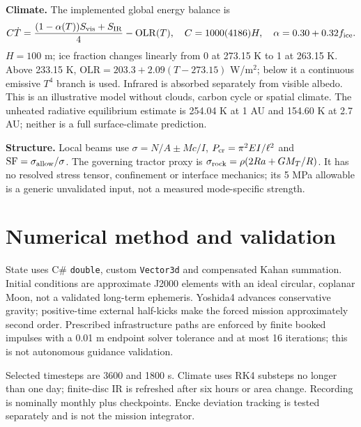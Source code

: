 ﻿\documentclass[10pt,a4paper]{article}
\begin{document}
\textbf{Climate.} The implemented global energy balance is
\[
C\dot T=\frac{(1-\alpha(T))S_{\rm vis}+S_{\rm IR}}4-\mathrm{OLR}(T),\quad
C=1000(4186)H,\quad \alpha=0.30+0.32f_{\rm ice}.
\]
$H=100$ m; ice fraction changes linearly from 0 at 273.15 K to 1 at 263.15 K. Above 233.15 K, $\mathrm{OLR}=203.3+2.09(T-273.15)$ W/m$^2$; below it a continuous emissive $T^4$ branch is used. Infrared is absorbed separately from visible albedo. This is an illustrative model without clouds, carbon cycle or spatial climate. The unheated radiative equilibrium estimate is 254.04 K at 1 AU and 154.60 K at 2.7 AU; neither is a full surface-climate prediction.

\textbf{Structure.} Local beams use $\sigma=N/A\pm Mc/I$, $P_{\rm cr}=\pi^2EI/\ell^2$ and $\mathrm{SF}=\sigma_{\rm allow}/\sigma$. The governing tractor proxy is $\sigma_{\rm rock}=\rho(2Ra+GM_T/R)$. It has no resolved stress tensor, confinement or interface mechanics; its 5 MPa allowable is a generic unvalidated input, not a measured mode-specific strength.
\newpage
\section{Numerical method and validation}
State uses C\# \texttt{double}, custom \texttt{Vector3d} and compensated Kahan summation. Initial conditions are approximate J2000 elements with an ideal circular, coplanar Moon, not a validated long-term ephemeris. Yoshida4 advances conservative gravity; positive-time external half-kicks make the forced mission approximately second order. Prescribed infrastructure paths are enforced by finite booked impulses with a 0.01 m endpoint solver tolerance and at most 16 iterations; this is not autonomous guidance validation.

Selected timesteps are 3600 and 1800 s. Climate uses RK4 substeps no longer than one day; finite-disc IR is refreshed after six hours or area change. Recording is nominally monthly plus checkpoints. Encke deviation tracking is tested separately and is not the mission integrator.
\end{document}
